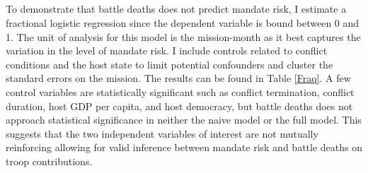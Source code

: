 \documentclass[12pt]{article}
\begin{document}


\clearpage

\begin{centering}
\section{}
\setcounter{table}{0}
\end{centering}


\begin{doublespace}

To demonstrate that battle deaths does not predict mandate risk, I estimate a fractional logistic regression since the dependent variable is bound between 0 and 1. The unit of analysis for this model is the mission-month as it best captures the variation in the level of mandate risk. I include controls related to conflict conditions and the host state to limit potential confounders and cluster the standard errors on the mission. The results can be found in Table \ref{Fraq}. A few control variables are statistically significant such as conflict termination, conflict duration, host GDP per capita, and host democracy, but battle deaths does not approach statistical significance in neither the naive model or the full model. This suggests that the two independent variables of interest are not mutually reinforcing allowing for valid inference between mandate risk and battle deaths on troop contributions.

\end{doublespace}

\vspace{-0.5em}


\end{document}
